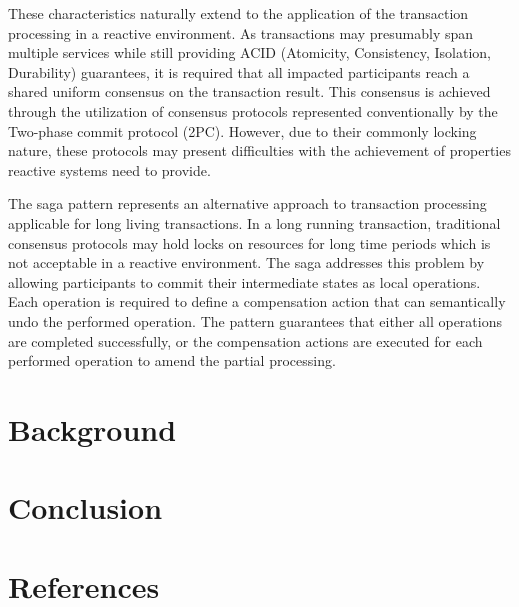 \documentclass[5p]{elsarticle}
\begin{document}
These characteristics naturally extend to the application of the transaction processing in a reactive environment. As transactions may presumably span multiple services while still providing ACID (Atomicity, Consistency, Isolation, Durability) guarantees, it is required that all impacted participants reach a shared uniform consensus on the transaction result. This consensus is achieved through the utilization of consensus protocols represented conventionally by the Two-phase commit protocol (2PC). However, due to their commonly locking nature, these protocols may present difficulties with the achievement of properties reactive systems need to provide.

The saga pattern \cite{sagas_publ} represents an alternative approach to transaction processing applicable for long living transactions. In a long running transaction, traditional consensus protocols may hold locks on resources for long time periods which is not acceptable in a reactive environment. The saga addresses this problem by allowing participants to commit their intermediate states as local operations. Each operation is required to define a compensation action that can semantically undo the performed operation. The pattern guarantees that either all operations are completed successfully, or the compensation actions are executed for each performed operation to amend the partial processing.

 
\section{Background}

 




\section{Conclusion} 

\section*{References}

\end{document}
